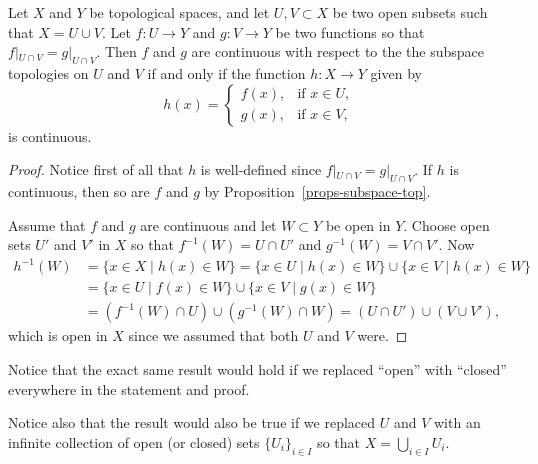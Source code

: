 \begin{lem}
  Let $X$ and $Y$ be topological spaces, and let $U,V \subset X$ be two open subsets such that $X = U \cup V$. Let $f : U \to Y$ and $g : V \to Y$ be two functions so that $f|_{U \cap V} = g|_{U \cap V}$. Then $f$ and $g$ are continuous with respect to the the subspace topologies on $U$ and $V$ if and only if the function $h : X \to Y$ given by
  \[
    h(x) = \begin{cases} f(x), & \text{if $x \in U$}, \\ g(x), & \text{if $x \in V$,} \end{cases}
  \]
  is continuous.
\end{lem}
\begin{proof}
  Notice first of all that $h$ is well-defined since $f|_{U \cap V} = g|_{U \cap V}$. If $h$ is continuous, then so are $f$ and $g$ by Proposition~\ref{props-subspace-top}.
  
  Assume that $f$ and $g$ are continuous and let $W \subset Y$ be open in $Y$. Choose open sets $U'$ and $V'$ in $X$ so that $f^{-1}(W) = U \cap U'$ and $g^{-1}(W) = V \cap V'$. Now
  \begin{align*}
    h^{-1}(W) &= \{ x \in X \mid h(x) \in W \} = \{x \in U \mid h(x) \in W \} \cup \{x \in V \mid h(x) \in W \} \\
              &= \{ x \in U \mid f(x) \in W \} \cup \{ x \in V \mid g(x) \in W \} \\
              &= (f^{-1}(W) \cap U) \cup (g^{-1}(W) \cap W) = (U \cap U') \cup (V \cup V'),
  \end{align*}
  which is open in $X$ since we assumed that both $U$ and $V$ were.
\end{proof}
\begin{rem}
  Notice that the exact same result would hold if we replaced ``open'' with ``closed'' everywhere in the statement and proof.
  
  Notice also that the result would also be true if we replaced $U$ and $V$ with an infinite collection of open (or closed) sets $\{U_i\}_{i \in I}$ so that $X = \bigcup_{i \in I} U_i$.
\end{rem}


